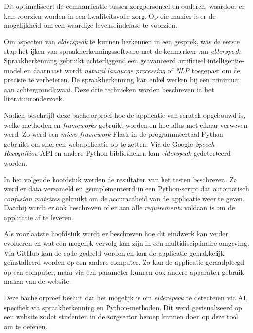 Dit optimaliseert de communicatie tussen zorgpersoneel en ouderen, waardoor er kan voorzien worden in een kwaliteitsvolle zorg. Op die manier is er de mogelijkheid om een waardige levenseindefase te voorzien.

Om aspecten van \textit{elderspeak} te kunnen herkennen in een gesprek, was de eerste stap het ijken van spraakherkenningssoftware met de kenmerken van \textit{elderspeak}. Spraakherkenning gebruikt achterliggend een geavanceerd artificieel intelligentie-model en daarnaast wordt \textit{natural language processing} of \textit{NLP} toegepast om de precisie te verbeteren. De spraakherkenning kan enkel werken bij een minimum aan achtergrondlawaai. Deze drie technieken worden beschreven in het literatuuronderzoek.

Nadien beschrijft deze bachelorproef hoe de applicatie van scratch opgebouwd is, welke methoden en \textit{frameworks} gebruikt worden en hoe alles met elkaar verweven werd. Zo werd een \textit{micro-framework} Flask in de programmeertaal Python gebruikt om snel een webapplicatie op te zetten. Via de Google \textit{Speech Recognition}-API en andere Python-bibliotheken kan \textit{elderspeak} gedetecteerd worden.

In het volgende hoofdstuk worden de resultaten van het testen beschreven. Zo werd er data verzameld en geïmplementeerd in een Python-script dat automatisch \textit{confusion matrixes} gebruikt om de accuraatheid van de applicatie weer te geven. Daarbij wordt er ook beschreven of er aan alle \textit{requirements} voldaan is om de applicatie af te leveren.

Als voorlaatste hoofdstuk wordt er beschreven hoe dit eindwerk kan verder evolueren en wat een mogelijk vervolg kan zijn in een multidisciplinaire omgeving. Via GitHub kan de code gedeeld worden en kan de applicatie gemakkelijk geïnstalleerd worden op een andere computer. Zo kan de applicatie geraadpleegd op een computer, maar via een parameter kunnen ook andere apparaten gebruik maken van de website.

Deze bachelorproef besluit dat het mogelijk is om \textit{elderspeak} te detecteren via AI, specifiek via spraakherkenning en Python-methoden. Dit werd gevisualiseerd op een website zodat studenten in de zorgsector beroep kunnen doen op deze tool om te oefenen.

